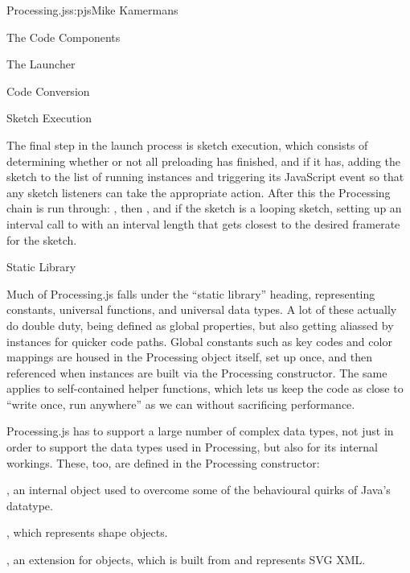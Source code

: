 \begin{aosachapter}{Processing.js}{s:pjs}{Mike Kamermans}
\begin{aosasect1}{The Code Components}
\begin{aosasect2}{The Launcher}
\begin{aosasect3}{Code Conversion}
\end{aosasect3}

\begin{aosasect3}{Sketch Execution}

The final step in the launch process is sketch execution, which
consists of determining whether or not all preloading has finished,
and if it has, adding the sketch to the list of running instances
and triggering its JavaScript  event so that any sketch
listeners can take the appropriate action. After this the Processing
chain is run through: , then , and if the
sketch is a looping sketch, setting up an interval call to 
with an interval length that gets closest to the desired framerate for
the sketch.

\end{aosasect3}

\end{aosasect2}

\begin{aosasect2}{Static Library}

Much of Processing.js falls under the ``static library'' heading,
representing constants, universal functions, and universal data
types. A lot of these actually do double duty, being defined as global
properties, but also getting aliassed by instances for quicker code
paths. Global constants such as key codes and color mappings are
housed in the Processing object itself, set up once, and then
referenced when instances are built via the Processing
constructor. The same applies to self-contained helper functions,
which lets us keep the code as close to ``write once, run anywhere'' as
we can without sacrificing performance.

Processing.js has to support a large number of complex data types, not
just in order to support the data types used in Processing, but also
for its internal workings. These, too, are defined in the Processing
constructor:

\begin{aosaitemize}

\item {}, an internal object used to overcome some of the
  behavioural quirks of Java's  datatype.

\item {}, which represents shape objects.

\item {}, an extension for  objects, which is built from and
  represents SVG XML.


\end{aosaitemize}
\end{aosasect2}
\end{aosasect1}
\end{aosachapter}
